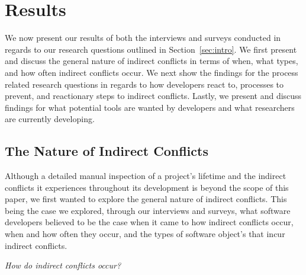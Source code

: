 \documentclass[conference]{IEEEtran}
\begin{document}
\section{Results}
\label{sec:rnd}

We now present our results of both the interviews and surveys conducted in regards to our research questions
outlined in Section~\ref{sec:intro}. We first present and discuss the general nature of indirect conflicts in
terms of when, what types, and how often indirect conflicts occur. We next show the findings for the process
related research questions in regards to how developers react to, processes to prevent, and reactionary steps
to indirect conflicts. Lastly, we present and discuss findings for what potential tools are wanted by developers
and what researchers are currently developing.

\subsection{The Nature of Indirect Conflicts}

Although a detailed manual inspection of a project's lifetime and the indirect conflicts it experiences throughout
its development is beyond the scope of this paper, we first wanted to explore the general nature of indirect 
conflicts. This being the case we explored, through our interviews and surveys, what software developers believed
to be the case when it came to how indirect conflicts occur, when and how often they occur, and the types of 
software object's that incur indirect conflicts.

\begin{description}[topsep=6pt]
	\item[RQ1] \textit{How do indirect conflicts occur?}
\end{description}
\end{document}
